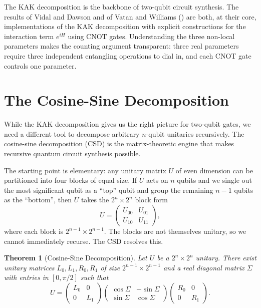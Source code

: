 \documentclass[12pt, a4paper, oneside]{report}
\theoremstyle{plain}
\newtheorem{theorem}{Theorem}[chapter]
\theoremstyle{definition}
\theoremstyle{remark}
\begin{document}
The KAK decomposition is the backbone of two-qubit circuit synthesis. The results of Vidal
and Dawson and of Vatan and Williams () are both, at their core,
implementations of the KAK decomposition with explicit constructions for the interaction
term $e^{iH}$ using CNOT gates. Understanding the three non-local parameters makes the counting
argument transparent: three real parameters require three independent entangling operations
to dial in, and each CNOT gate controls one parameter.


\section{The Cosine-Sine Decomposition}

While the KAK decomposition gives us the right picture for two-qubit gates, we need a
different tool to decompose arbitrary $n$-qubit unitaries recursively. The cosine-sine
decomposition (CSD) is the matrix-theoretic engine that makes recursive quantum circuit
synthesis possible.

The starting point is elementary: any unitary matrix $U$ of even dimension can be partitioned
into four blocks of equal size. If $U$ acts on $n$ qubits and we single out the most
significant qubit as a ``top'' qubit and group the remaining $n-1$ qubits as the ``bottom'',
then $U$ takes the $2^n \times 2^n$ block form
\[
	U = \begin{pmatrix} U_{00} & U_{01} \\ U_{10} & U_{11} \end{pmatrix},
\]
where each block is $2^{n-1} \times 2^{n-1}$. The blocks are not themselves unitary, so we
cannot immediately recurse. The CSD resolves this.

\begin{theorem}[Cosine-Sine Decomposition]
	\label{thm:csd}
	Let $U$ be a $2^n \times 2^n$ unitary. There exist unitary matrices $L_0, L_1, R_0, R_1$
	of size $2^{n-1} \times 2^{n-1}$ and a real diagonal matrix $\Sigma$ with entries in
	$[0, \pi/2]$ such that
	\[
		U
		= \begin{pmatrix} L_0 & 0 \\ 0 & L_1 \end{pmatrix}
		\begin{pmatrix} \cos\Sigma & -\sin\Sigma \\ \sin\Sigma & \cos\Sigma \end{pmatrix}
		\begin{pmatrix} R_0 & 0 \\ 0 & R_1 \end{pmatrix}.
	\]
\end{theorem}
\end{document}
